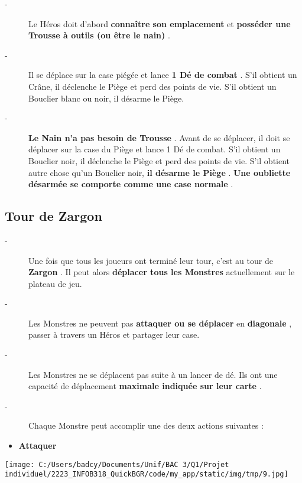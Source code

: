 \documentclass{scrartcl}%
\begin{document}
\begin{description}%
\item[{-} ]%
%
 Le Héros doit d'abord %
\textbf{connaître son emplacement}%
\textit{ }%
 et %
\textbf{posséder une Trousse à outils (ou être le nain)}%
.
%
\item[{-} ]%
%
 Il se déplace sur la case piégée et lance %
\textbf{1 Dé de combat}%
. S'il obtient un Crâne, il déclenche le Piège et perd des points de vie. S'il obtient un Bouclier blanc ou noir, il désarme le Piège.
%
\item[{-} ]%
%
\textbf{Le Nain n'a pas besoin de Trousse}%
. Avant de se déplacer, il doit se déplacer sur la case du Piège et lance 1 Dé de combat. S'il obtient un Bouclier noir, il déclenche le Piège et perd des points de vie. S'il obtient autre chose qu'un Bouclier noir, %
\textbf{il désarme le Piège}%
. %
\textbf{Une oubliette désarmée se comporte comme une case normale}%
.
%
\end{description}

%
\subsection{ Tour de Zargon
}%
\label{subsec:TourdeZargon}%
\begin{description}%
\item[{-} ]%
%
 Une fois que tous les joueurs ont terminé leur tour, c'est au tour de %
\textbf{Zargon}%
. Il peut alors%
\textbf{ déplacer tous les Monstres}%
\textit{ }%
 actuellement sur le plateau de jeu.
%
\item[{-} ]%
%
 Les Monstres ne peuvent pas%
\textbf{attaquer ou se déplacer}%
\textit{ }%
 en %
\textbf{diagonale}%
, passer à travers un Héros et partager leur case.
%
\item[{-} ]%
%
 Les Monstres ne se déplacent pas suite à un lancer de dé. Ils ont une capacité de déplacement %
\textbf{maximale indiquée sur leur carte}%
.
%
\item[{-} ]%
%
 Chaque Monstre peut accomplir une des deux actions suivantes :
%
\end{description}%
\begin{itemize}%
\item%
%
\textbf{Attaquer}%

%
\end{itemize}%
%
\begin{center}\texttt{[image: C:/Users/badcy/Documents/Unif/BAC 3/Q1/Projet individuel/2223\_INFOB318\_QuickBGR/code/my\_app/static/img/tmp/9.jpg]}\end{center}%
\end{document}
